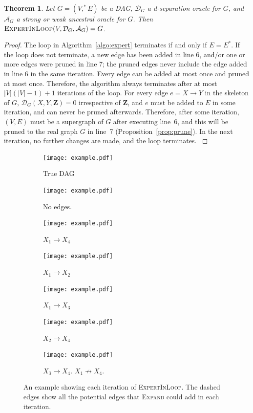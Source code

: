 \documentclass{uai2025} %
\newtheorem{theorem}{Theorem}
\begin{document}
\begin{theorem}
Let $G=(V,^*E)$ be a DAG, $\mathcal{D}_G$ a d-separation oracle for $G$, and 
$\mathcal{A}_G$ a strong or weak ancestral oracle for $G$. Then 
$\textsc{ExpertInLoop}(V,\mathcal{D}_G,\mathcal{A}_G)=G$.
\end{theorem}

\begin{proof}
The loop in Algorithm~\ref{algo:expert} terminates if and 
only if $E=E^*$. If the loop does not  terminate, a new
 edge has been added in line 6, and/or one or more edges were 
pruned in line 7; the pruned edges never include the edge added 
in line 6 in the same iteration. Every edge can be added at 
most once and pruned at most once. Therefore, the algorithm 
always terminates after at most $|V|(|V|-1)+1$ iterations of
the loop. For every edge $e=X\to Y $ in the skeleton of $G$, 
$\mathcal{D}_G(X,Y,\mathbf{Z})=0$ irrespective of $\mathbf{Z}$, 
and $e$ must be added to $E$ in some iteration, and can never 
be pruned afterwards. Therefore, after some iteration, 
$(V,E)$ must be a supergraph of $G$ after executing line~6, 
and this will be pruned to the real graph $G$ in line~7 
(Proposition~\ref{prop:prune}). In the next iteration, 
no further changes are made, and the loop terminates.
\label{thm:itworks}
\end{proof} 


\begin{figure}[t!]
	\begin{subfigure}{0.125 \textwidth}
		\centering
		\texttt{[image: example.pdf]}
		\caption{True DAG}
	\end{subfigure}%
	\begin{subfigure}{0.125 \textwidth}
		\centering
		\texttt{[image: example.pdf]}
		\caption{No edges.}
	\end{subfigure}%
	\begin{subfigure}{0.125 \textwidth}
		\centering
		\texttt{[image: example.pdf]}
		\caption{$ X_1 \rightarrow X_4 $}
	\end{subfigure}%
	\begin{subfigure}{0.125 \textwidth}
		\centering
		\texttt{[image: example.pdf]}
		\caption{$ X_1 \rightarrow X_2 $}
	\end{subfigure}
	\begin{subfigure}{0.125 \textwidth}
		\centering
		\texttt{[image: example.pdf]}
		\caption{$ X_1 \rightarrow X_3 $}
	\end{subfigure}%
	\begin{subfigure}{0.125 \textwidth}
		\centering
		\texttt{[image: example.pdf]}
		\caption{$ X_2 \rightarrow X_4 $}
	\end{subfigure}%
	\begin{subfigure}{0.250 \textwidth}
		\centering
		\texttt{[image: example.pdf]}
		\caption{$ X_3 \rightarrow X_4 $. $ X_1 \not \rightarrow X_4 $.}
	\end{subfigure}
	\caption{An example showing each iteration of \textsc{ExpertInLoop}. The dashed edges show all the potential edges that \textsc{Expand} could add in each iteration.}
\end{figure}
\end{document}
